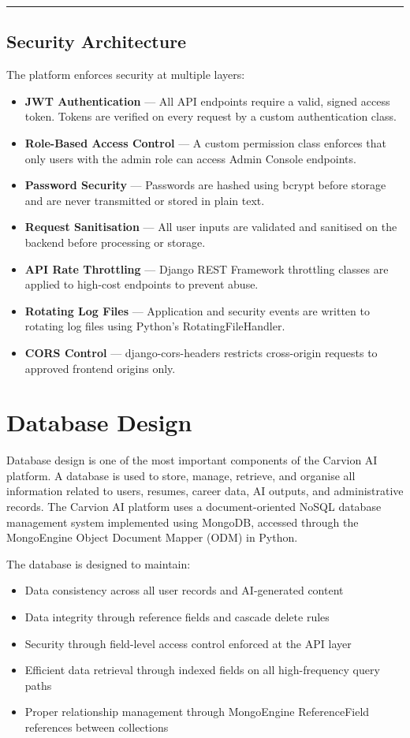 \documentclass[12pt]{article}
\begin{document}
\noindent\rule{\textwidth}{0.4pt}

\subsection{Security Architecture}

The platform enforces security at multiple layers:

\begin{itemize}
  \item \textbf{JWT Authentication} — All API endpoints require a valid, signed access token. Tokens are verified on every request by a custom authentication class.
  \item \textbf{Role-Based Access Control} — A custom permission class enforces that only users with the admin role can access Admin Console endpoints.
  \item \textbf{Password Security} — Passwords are hashed using bcrypt before storage and are never transmitted or stored in plain text.
  \item \textbf{Request Sanitisation} — All user inputs are validated and sanitised on the backend before processing or storage.
  \item \textbf{API Rate Throttling} — Django REST Framework throttling classes are applied to high-cost endpoints to prevent abuse.
  \item \textbf{Rotating Log Files} — Application and security events are written to rotating log files using Python's RotatingFileHandler.
  \item \textbf{CORS Control} — django-cors-headers restricts cross-origin requests to approved frontend origins only.
\end{itemize}

\clearpage
\section{Database Design}

Database design is one of the most important components of the Carvion AI platform. A database is used to store, manage, retrieve, and organise all information related to users, resumes, career data, AI outputs, and administrative records. The Carvion AI platform uses a document-oriented NoSQL database management system implemented using MongoDB, accessed through the MongoEngine Object Document Mapper (ODM) in Python.

The database is designed to maintain:

\begin{itemize}
  \item Data consistency across all user records and AI-generated content
  \item Data integrity through reference fields and cascade delete rules
  \item Security through field-level access control enforced at the API layer
  \item Efficient data retrieval through indexed fields on all high-frequency query paths
  \item Proper relationship management through MongoEngine ReferenceField references between collections
\end{itemize}
\end{document}
